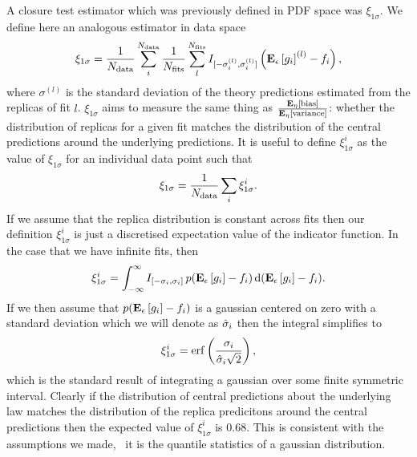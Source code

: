A closure test estimator which was previously defined in PDF space was
$\xi_{1\sigma}$. We define here an analogous estimator in data space
\begin{equation}
    \label{eq:XiDataDef}
    \xi_{1\sigma} = 
        \frac{1}{N_{\rm data}} \sum_{i}^{N_{\rm data}} 
        \frac{1}{N_{\rm fits}} \sum_{l}^{N_{\rm fits}}
            I_{[-\sigma_i^{(l)}, \sigma_i^{(l)}]}
            \left( \mathbf{E}_{\epsilon}\left[ g_i \right]^{(l)} - f_i \right),
\end{equation}
where $\sigma^{(l)}$ is the standard deviation of the theory predictions
estimated from the replicas of fit $l$. $\xi_{1\sigma}$ aims to measure the same
thing as $\frac{\mathbf{E}_{\eta}\left[ {\rm bias} \right]}{\mathbf{E}_{\eta}\left[ {\rm variance} \right]}$: whether the distribution of
replicas for a given fit matches the distribution of the central predictions
around the underlying predictions. It is useful to define $\xi_{1\sigma}^{i}$ as
the value of $\xi_{1\sigma}$ for an individual data point such that
\begin{equation}
    \label{eq:XiDataIDel}
    \xi_{1\sigma} = \frac{1}{N_{\rm data}} \sum_i \xi_{1\sigma}^{i}.
\end{equation}
If we assume that the replica distribution is constant across fits then our
definition $\xi_{1\sigma}^{i}$ is just a discretised expectation value of the
indicator function. In the case that we have infinite fits, then
\begin{equation}
    \label{eq:XiIExpecVel}
    \xi_{1\sigma}^{i} = 
    \int_{-\infty}^{\infty} I_{[-\sigma_i, \sigma_i]}\, 
    p(\mathbf{E}_{\epsilon}\left[ g_i \right] - f_i)\, 
    {\rm d}(\mathbf{E}_{\epsilon}\left[ g_i \right] - f_i).
\end{equation}
If we then assume that $p(\mathbf{E}_{\epsilon}\left[ g_i \right] - f_i)$ is a gaussian centered on
zero with a standard deviation which we will denote as $\hat{\sigma}_i$ then the
integral simplifies to
\begin{equation}
    \label{eq:expectedxi}
    \xi_{1\sigma}^{i} = 
    {\rm erf} \left( \frac{\sigma_i}{\hat{\sigma}_i \sqrt{2}}\right),
\end{equation}
which is the standard result of integrating a gaussian over some finite
symmetric interval. Clearly if the distribution of central predictions about the
underlying law matches the distribution of the replica predicitons around the
central predictions then the expected value of $\xi_{1\sigma}^{i}$ is 0.68. This
is consistent with the assumptions we made, \viz\ it is  the quantile statistics
of a gaussian distribution.

